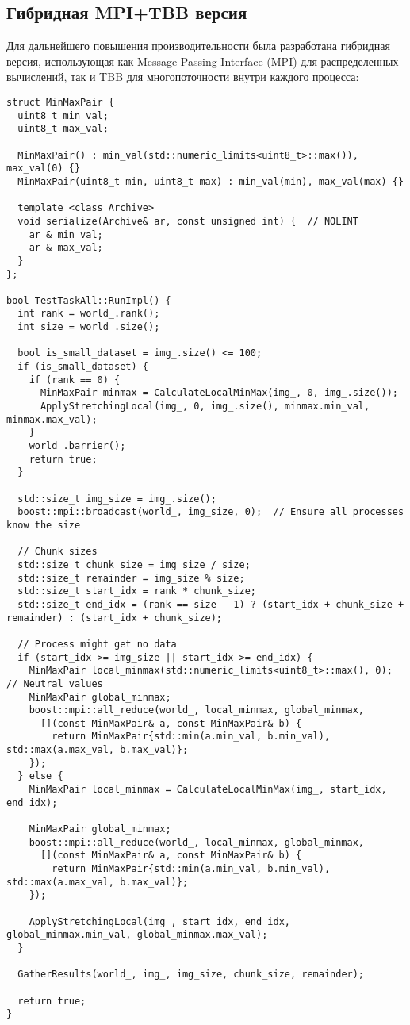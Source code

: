 \documentclass[a4paper,14pt]{article}
\begin{document}
\subsection{Гибридная MPI+TBB версия}

Для дальнейшего повышения производительности была разработана гибридная версия, использующая
как Message Passing Interface (MPI) для распределенных вычислений, так и TBB для многопоточности
внутри каждого процесса:

\begin{lstlisting}[caption=Ключевые компоненты MPI+TBB версии]
struct MinMaxPair {
  uint8_t min_val;
  uint8_t max_val;

  MinMaxPair() : min_val(std::numeric_limits<uint8_t>::max()), max_val(0) {}
  MinMaxPair(uint8_t min, uint8_t max) : min_val(min), max_val(max) {}

  template <class Archive>
  void serialize(Archive& ar, const unsigned int) {  // NOLINT
    ar & min_val;
    ar & max_val;
  }
};

bool TestTaskAll::RunImpl() {
  int rank = world_.rank();
  int size = world_.size();

  bool is_small_dataset = img_.size() <= 100;
  if (is_small_dataset) {
    if (rank == 0) {
      MinMaxPair minmax = CalculateLocalMinMax(img_, 0, img_.size());
      ApplyStretchingLocal(img_, 0, img_.size(), minmax.min_val, minmax.max_val);
    }
    world_.barrier();
    return true;
  }

  std::size_t img_size = img_.size();
  boost::mpi::broadcast(world_, img_size, 0);  // Ensure all processes know the size

  // Chunk sizes
  std::size_t chunk_size = img_size / size;
  std::size_t remainder = img_size % size;
  std::size_t start_idx = rank * chunk_size;
  std::size_t end_idx = (rank == size - 1) ? (start_idx + chunk_size + remainder) : (start_idx + chunk_size);

  // Process might get no data
  if (start_idx >= img_size || start_idx >= end_idx) {
    MinMaxPair local_minmax(std::numeric_limits<uint8_t>::max(), 0);  // Neutral values
    MinMaxPair global_minmax;
    boost::mpi::all_reduce(world_, local_minmax, global_minmax, 
      [](const MinMaxPair& a, const MinMaxPair& b) {
        return MinMaxPair{std::min(a.min_val, b.min_val), std::max(a.max_val, b.max_val)};
    });
  } else {
    MinMaxPair local_minmax = CalculateLocalMinMax(img_, start_idx, end_idx);

    MinMaxPair global_minmax;
    boost::mpi::all_reduce(world_, local_minmax, global_minmax, 
      [](const MinMaxPair& a, const MinMaxPair& b) {
        return MinMaxPair{std::min(a.min_val, b.min_val), std::max(a.max_val, b.max_val)};
    });

    ApplyStretchingLocal(img_, start_idx, end_idx, global_minmax.min_val, global_minmax.max_val);
  }

  GatherResults(world_, img_, img_size, chunk_size, remainder);

  return true;
}
\end{lstlisting}
\end{document}
